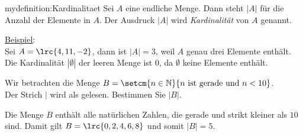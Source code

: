 \begin{mydefinition}{mydefinition:Kardinalitaet}
Sei $A$ eine endliche Menge. Dann steht $|A|$ für die Anzahl der Elemente in $A$. Der Ausdruck $|A|$ wird \textit{Kardinalität} von $A$ genannt.
\end{mydefinition}
\underline{Beispiel}:\\
Sei $A = \lrc{4, 11, -2}$, dann ist $|A| = 3$, weil $A$ genau drei Elemente enthält. Die Kardinalität $|\emptyset|$ der leeren Menge ist $0$, da $\emptyset$ keine Elemente enthält.

\begin{myexercise}%
	\noindent
	Wir betrachten die Menge $B = \setcm{n\in\mathbb{N}}{n \text{ ist gerade und } n < 10}$.\\ Der Strich $|$ wird als  gelesen. Bestimmen Sie $|B|$.\\
\end{myexercise}
\begin{myanswer}
	\noindent
	Die Menge $B$ enthält alle natürlichen Zahlen, die gerade und strikt kleiner als $10$ sind. Damit gilt $B = \lrc{0,2,4,6,8}$ und somit $|B| = 5$.\\
\end{myanswer}
